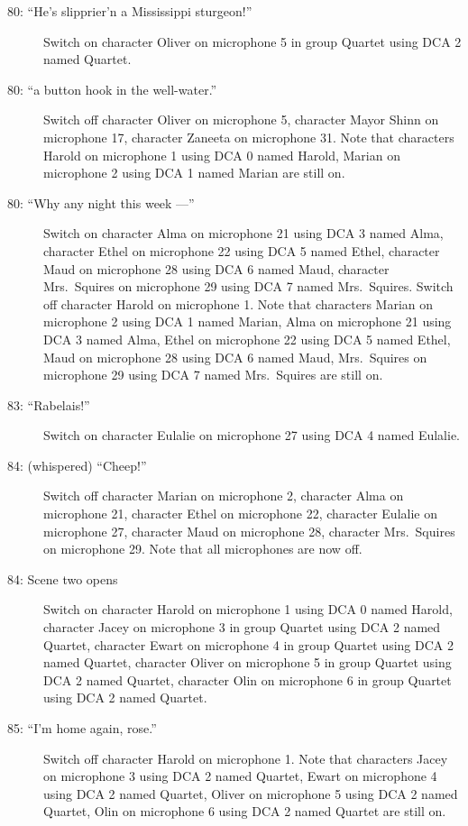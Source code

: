 \begin{description}
\item[80: ``He's slipprier'n a Mississippi sturgeon!'']
Switch on character Oliver on microphone 5 in group Quartet using DCA 2 named Quartet. 

\item[80: ``a button hook in the well-water.'']
Switch off character Oliver on microphone 5, character Mayor Shinn on microphone 17, character Zaneeta on microphone 31. Note that characters Harold on microphone 1 using DCA 0 named Harold, Marian on microphone 2 using DCA 1 named Marian are still on.  

\item[80: ``Why any night this week ---'']
Switch on character Alma on microphone 21 using DCA 3 named Alma, character Ethel on microphone 22 using DCA 5 named Ethel, character Maud on microphone 28 using DCA 6 named Maud, character Mrs.~Squires on microphone 29 using DCA 7 named Mrs.~Squires. Switch off character Harold on microphone 1. Note that characters Marian on microphone 2 using DCA 1 named Marian, Alma on microphone 21 using DCA 3 named Alma, Ethel on microphone 22 using DCA 5 named Ethel, Maud on microphone 28 using DCA 6 named Maud, Mrs.~Squires on microphone 29 using DCA 7 named Mrs.~Squires are still on.  

\item[83: ``Rabelais!'']
Switch on character Eulalie on microphone 27 using DCA 4 named Eulalie. 

\item[84: (whispered) ``Cheep!'']
Switch off character Marian on microphone 2, character Alma on microphone 21, character Ethel on microphone 22, character Eulalie on microphone 27, character Maud on microphone 28, character Mrs.~Squires on microphone 29. Note that all microphones are now off.

\item[84: Scene two opens]
Switch on character Harold on microphone 1 using DCA 0 named Harold, character Jacey on microphone 3 in group Quartet using DCA 2 named Quartet, character Ewart on microphone 4 in group Quartet using DCA 2 named Quartet, character Oliver on microphone 5 in group Quartet using DCA 2 named Quartet, character Olin on microphone 6 in group Quartet using DCA 2 named Quartet. 

\item[85: ``I'm home again, rose.'']
Switch off character Harold on microphone 1. Note that characters Jacey on microphone 3 using DCA 2 named Quartet, Ewart on microphone 4 using DCA 2 named Quartet, Oliver on microphone 5 using DCA 2 named Quartet, Olin on microphone 6 using DCA 2 named Quartet are still on.  


\end{description}
